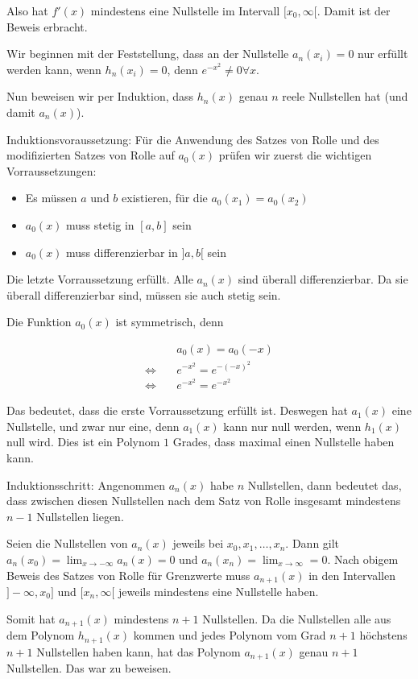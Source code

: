\documentclass[a4paper,german,12pt,smallheadings]{scrartcl}
\begin{document}
Also hat $f'(x)$ mindestens eine Nullstelle im Intervall $[x_0, \infty[$. Damit
ist der Beweis erbracht.

Wir beginnen mit der Feststellung, dass an der Nullstelle $a_n(x_i) = 0$ nur
erfüllt werden kann, wenn $h_n(x_i) = 0$, denn $e^{-x^2} \neq 0 \forall x$.

Nun beweisen wir per Induktion, dass $h_n(x)$ genau $n$ reele Nullstellen hat
(und damit $a_n(x)$).

Induktionsvoraussetzung: Für die Anwendung des Satzes von Rolle und des
modifizierten Satzes von Rolle auf $a_0(x)$ prüfen wir zuerst die wichtigen
Vorraussetzungen:

\begin{itemize}
  \item Es müssen $a$ und $b$ existieren, für die $a_0(x_1) = a_0(x_2)$
  \item $a_0(x)$ muss stetig in $[a,b]$ sein
  \item $a_0(x)$ muss differenzierbar in $]a,b[$ sein
\end{itemize}

Die letzte Vorraussetzung erfüllt. Alle $a_n(x)$ sind überall differenzierbar.
Da sie überall differenzierbar sind, müssen sie auch stetig sein.

Die Funktion $a_0(x)$ ist symmetrisch, denn

\begin{align*}
  &a_0(x) = a_0(-x) \\
  \Leftrightarrow\quad &e^{-x^2} = e^{-(-x)^2} \\
  \Leftrightarrow\quad &e^{-x^2} = e^{-x^2}
\end{align*}

Das bedeutet, dass die erste Vorraussetzung erfüllt ist. Deswegen hat $a_1(x)$
eine Nullstelle, und zwar nur eine, denn $a_1(x)$ kann nur null werden, wenn
$h_1(x)$ null wird. Dies ist ein Polynom $1$ Grades, dass maximal einen
Nullstelle haben kann.

Induktionsschritt: Angenommen $a_n(x)$ habe $n$ Nullstellen, dann bedeutet das,
dass zwischen diesen Nullstellen nach dem Satz von Rolle insgesamt mindestens $n-1$
Nullstellen liegen.

Seien die Nullstellen von $a_n(x)$ jeweils bei $x_0, x_1, \dots, x_n$. Dann
gilt $a_n(x_0) = \lim_{x \to -\infty} a_n(x) = 0$ und $a_n(x_n) = \lim_{x \to
\infty} = 0$. Nach obigem Beweis des Satzes von Rolle für Grenzwerte muss $a_{n+1}(x)$
in den Intervallen $]-\infty,x_0]$ und $[x_n,\infty[$ jeweils mindestens eine
Nullstelle haben.

Somit hat $a_{n+1}(x)$ mindestens $n+1$ Nullstellen. Da die Nullstellen alle
aus dem Polynom $h_{n+1}(x)$ kommen und jedes Polynom vom Grad $n+1$ höchstens
$n+1$ Nullstellen haben kann, hat das Polynom $a_{n+1}(x)$ genau $n+1$
Nullstellen. Das war zu beweisen.
\end{document}
